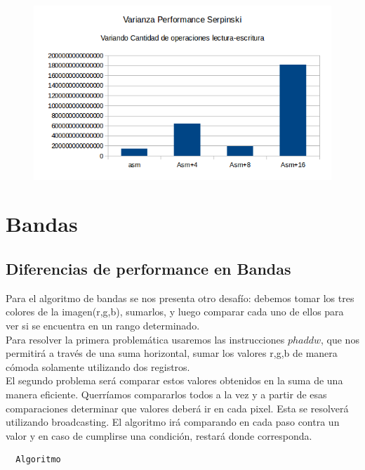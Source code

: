 \documentclass[a4paper]{article}
\begin{document}
\begin{figure}[h!]
  \begin{center}
  \includegraphics[scale=0.66]{Graficos1.5/sie/pushpop/var.png}
  \label{nombreparareferenciar1}
  \end{center}
\end{figure}



\newpage
\section{Bandas}
\subsection{Diferencias de performance en Bandas}
Para el algoritmo de bandas se nos presenta otro desafío: debemos tomar los tres colores de la imagen(r,g,b), sumarlos, y luego comparar cada uno de ellos para ver si se encuentra en un rango determinado.
\\
Para resolver la primera problemática usaremos las instrucciones $phaddw$, que nos permitirá a través de una suma horizontal, sumar los valores r,g,b de manera cómoda solamente utilizando dos registros.
\\
El segundo problema será comparar estos valores obtenidos en la suma de una manera eficiente. Querríamos compararlos todos a la vez y a partir de esas comparaciones determinar que valores deberá ir en cada pixel. Esta se resolverá utilizando broadcasting. El algoritmo irá comparando en cada paso contra un valor y en caso de cumplirse una condición, restará donde corresponda.

\begin{codesnippet}
\begin{verbatim}
  Algoritmo
\end{verbatim}
\end{codesnippet}
\end{document}
